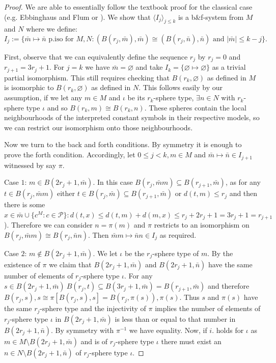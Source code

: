 \documentclass{lmcs} %
\newcommand{\?}{\ensuremath{\mkern0.4\thinmuskip}}
\let\isom=\cong%
\newcommand{\CP}{\mathcal{P}}
\begin{document}
\begin{proof} 
    We are able to essentially follow the textbook proof for the classical case (e.g. Ebbinghaus and Flum \cite[Theorem 1.4.1]{EbbinghausFlum95:Finmodeltheory} or \cite[Theorem 4.24]{Libkin04:Elementsfinmod}). We show that $\langle I_j\rangle_{j\leq k}$ is a b\&f-system from $M$ and $N$ where we define:\[I_j:=\{\bar{m}\mapsto\bar{n}\text{ p.iso for }M,N:(B(r_j,\bar{m}),\bar{m})\isom (B(r_j,\bar{n}),\bar{n})\text{ and }|\bar{m}|\leq k-j\}.\]
    
    First, observe that we can equivalently define the sequence $r_j$ by $r_j=0$ and $r_{j+1}=3r_j+1$. For $j=k$ we have $\bar{m}=\varnothing$ and take $I_k=\{\varnothing\mapsto\varnothing\}$ as a trivial partial isomorphism. This still requires checking that $B(r_k,\varnothing)$ as defined in $M$ is isomorphic to $B(r_k,\varnothing)$ as defined in $N$. This follows easily by our assumption, if we let any $m\in M$ and $\iota$ be its $r_k$-sphere type, $\exists n\in N$ with $r_k$-sphere type $\iota$ and so $B(r_k,m)\isom B(r_k,n)$. These spheres contain the local neighbourhoods of the interpreted constant symbols in their respective models, so we can restrict our isomorphism onto those neighbourhoods.     

    Now we turn to the back and forth conditions. By symmetry it is enough to prove the forth condition. Accordingly, let $0\leq j<k,m\in M$ and $\bar{m}\mapsto\bar{n}\in I_{j+1}$ witnessed by say $\pi$. 

    Case $1$: $m\in B(2r_j+1,\bar{m})$. In this case $B(r_j,\bar{m}m)\subseteq B(r_{j+1},\bar{m})$, as for any $t\in B(r_j,\bar{m}m)$ either $t\in B(r_j,\bar{m})\subseteq B(r_{j+1},\bar{m})$ or $d(t,m)\leq r_j$ and then there is some $x\in \bar{m}\cup\{c^M:c\in\CP\}:d(t,x)\leq d(t,m)+d(m,x)\leq r_j+2r_j+1=3r_j+1=r_{j+1}$). Therefore we can consider $n=\pi(m)$ and $\pi$ restricts to an isomorphism on $B(r_j,\bar{m}m)\isom B(r_j,\bar{n}n)$. Then $\bar{m}m\mapsto\bar{n}n\in I_j$ as required. 

    Case $2$: $m\not\in B(2r_j+1,\bar{m})$. We let $\iota$ be the $r_j$-sphere type of $m$. By the existence of $\pi$ we claim that $B(2r_j+1,\bar{m})$ and $B(2r_j+1,\bar{n})$ have the same number of elements of $r_j$-sphere type $\iota$. For any $s\in B(2r_j+1,\bar{m})\ B(r_j,t)\subseteq B(3r_j+1,\bar{m})=B(r_{j+1},\bar{m})$ and therefore $B(r_j,s),s\isom \pi[B(r_j,s),s]=B(r_j,\pi(s)),\pi(s)$. Thus $s$ and $\pi(s)$ have the same $r_j$-sphere type and the injectivity of $\pi$ implies the number of elements of $r_j$-sphere type $\iota$ in $B(2r_j+1,\bar{m})$ is less than or equal to that number in $B(2r_j+1,\bar{n})$. By symmetry with $\pi^{-1}$ we have equality. Now, if $i$. holds for $\iota$ as $m\in M\setminus B(2r_j+1,\bar{m})$ and is of $r_j$-sphere type $\iota$ there must exist an $n\in N\setminus B(2r_j+1,\bar{n})$ of $r_j$-sphere type $\iota$. 
    

\end{proof}
\end{document}
